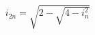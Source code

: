 \documentclass[preview]{standalone}
\begin{document}
\begin{align*}
i_{2n} = \sqrt{2 - \sqrt{4 - i_n^2}}
\end{align*}
\end{document}
